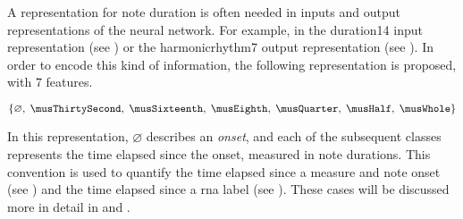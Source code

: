 
A representation for note duration is often needed in inputs
and output representations of the neural network. For
example, in the \gls{duration14} input representation (see
) or the \gls{harmonicrhythm7} output
representation (see ). In
order to encode this kind of information, the following
representation is proposed, with 7 features.

\begin{equation}
    \{\varnothing,\; \musThirtySecond,\; \musSixteenth,\; \musEighth,\; 
    \musQuarter,\; \musHalf,\; \musWhole \}
\end{equation}

In this representation, $\varnothing$ describes an
\emph{onset}, and each of the subsequent classes represents
the time elapsed since the onset, measured in note
durations. This convention is used to quantify the time
elapsed since a measure and note onset (see
) and the time elapsed since
a \gls{rna} label (see ).
These cases will be discussed more in detail in
 and .
